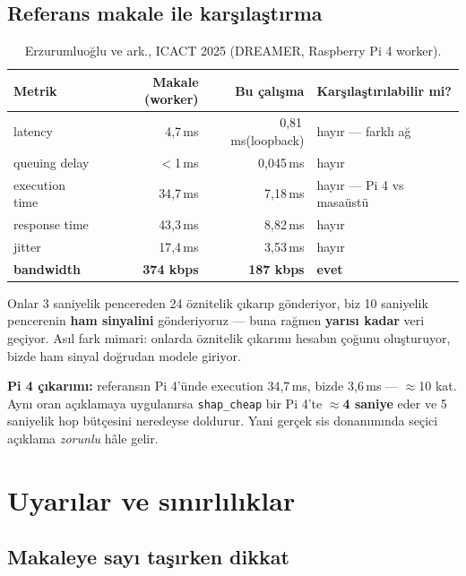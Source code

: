 \documentclass[11pt,a4paper]{article}
\newcommand{\ms}{\,ms}
\newcommand{\kod}[1]{\texttt{\small #1}}
\begin{document}
\subsection{Referans makale ile karşılaştırma}

\begin{table}[H]
\centering\small
\begin{tabular}{@{}lrrl@{}}
\toprule
\textbf{Metrik} & \textbf{Makale (worker)} & \textbf{Bu çalışma} & \textbf{Karşılaştırılabilir mi?} \\
\midrule
latency        & 4{,}7\ms  & 0{,}81\ms (loopback) & hayır --- farklı ağ \\
queuing delay  & $<$1\ms   & 0{,}045\ms & hayır \\
execution time & 34{,}7\ms & 7{,}18\ms  & hayır --- Pi 4 vs masaüstü \\
response time  & 43{,}3\ms & 8{,}82\ms  & hayır \\
jitter         & 17{,}4\ms & 3{,}53\ms  & hayır \\
\textbf{bandwidth} & \textbf{374 kbps} & \textbf{187 kbps} & \textbf{evet} \\
\bottomrule
\end{tabular}
\caption{Erzurumluoğlu ve ark., ICACT 2025 (DREAMER, Raspberry Pi 4 worker).}
\end{table}

\begin{bulgu}
Onlar 3 saniyelik pencereden 24 öznitelik çıkarıp gönderiyor, biz 10 saniyelik
pencerenin \textbf{ham sinyalini} gönderiyoruz --- buna rağmen \textbf{yarısı
kadar} veri geçiyor. Asıl fark mimari: onlarda öznitelik çıkarımı hesabın
çoğunu oluşturuyor, bizde ham sinyal doğrudan modele giriyor.

\textbf{Pi 4 çıkarımı:} referansın Pi 4'ünde execution 34{,}7\ms, bizde
3{,}6\ms{} --- $\approx$10 kat. Aynı oran açıklamaya uygulanırsa
\kod{shap\_cheap} bir Pi 4'te \textbf{$\approx$4 saniye} eder ve 5 saniyelik
hop bütçesini neredeyse doldurur. Yani gerçek sis donanımında seçici açıklama
\emph{zorunlu} hâle gelir.
\end{bulgu}

\section{Uyarılar ve sınırlılıklar}

\subsection{Makaleye sayı taşırken dikkat}
\end{document}
